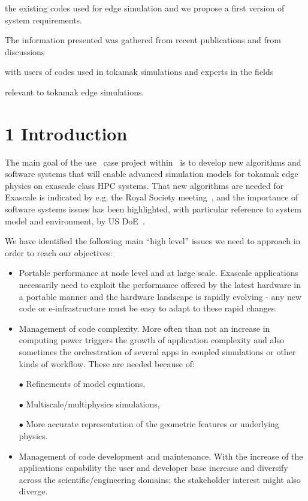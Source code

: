\documentclass{article}
\begin{document}
the existing codes used for edge simulation and we propose a first version of system 
requirements. 

The information presented was gathered from recent publications and from discussions 

with users of codes used in tokamak simulations and experts in the fields 

relevant to tokamak edge simulations. \pagebreak{}


\section*{{\Large{}{ \textbf{1 Introduction}}}}

\baselineskip=18pt
The main goal of the use \nep \   case project within \exc \   is to develop new 
algorithms and software systems that will enable advanced simulation models for 
tokamak edge physics on exascale class HPC systems. That new algorithms are needed 
for Exascale is indicated by e.g. the Royal Society meeting~\cite{sciplan}, and the importance 
of software systems issues has been highlighted, with particular reference to system 
model and environment, by US DoE~\cite{pappeqs}.

We have identified the following main ``high level'' issues we need to approach 
in order to reach our objectives:

\begin{itemize}
\item Portable performance at node level and at large scale. Exascale applications 
necessarily need to exploit the performance offered by the latest hardware in a 
portable manner and the hardware landscape is rapidly evolving - any new code or 
e-infrastructure must be easy to adapt to these rapid changes.

\item Management of code complexity. More often than not an increase in computing 
power triggers the growth of application complexity and also sometimes the orchestration 
of several apps in coupled simulations or other kinds of workflow. These are needed 
because of:

\item[$\bullet$] Refinements of model equations,

\item[$\bullet$] Multiscale/multiphysics simulations,

\item[$\bullet$] More accurate representation of the geometric features or underlying physics.

\item Management of code development and maintenance. With the increase of the applications 
capability the user and developer base increase and diversify across the scientific/engineering 
domains; the stakeholder interest might also diverge.

\end{itemize}
\end{document}
